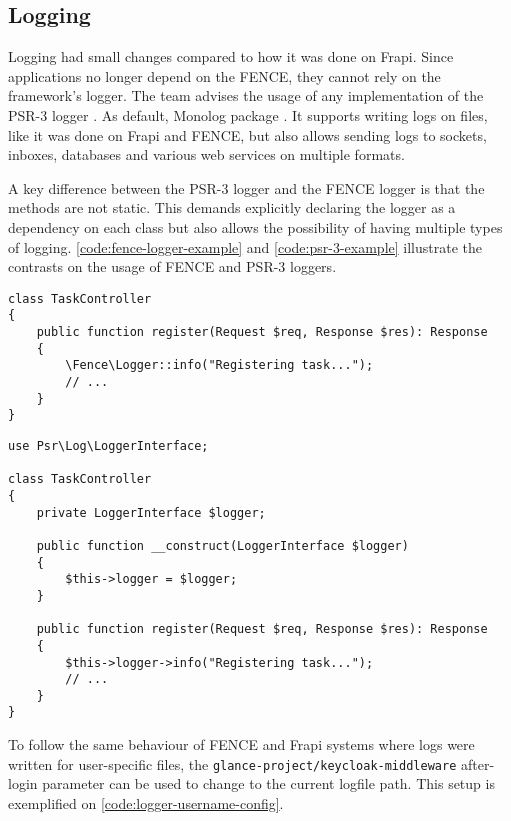 \subsection{Logging}

Logging had small changes compared to how it was done on Frapi. Since applications no longer depend on the FENCE, they cannot rely on the framework's logger. The team advises the usage of any implementation of the PSR-3 logger \cite{psr-3}. As default, Monolog package \cite{monolog}. It supports writing logs on files, like it was done on Frapi and FENCE, but also allows sending logs to sockets, inboxes, databases and various web services on multiple formats.

A key difference between the PSR-3 logger and the FENCE logger is that the methods are not static. This demands explicitly declaring the logger as a dependency on each class but also allows the possibility of having multiple types of logging. \autoref{code:fence-logger-example} and \autoref{code:psr-3-example} illustrate the contrasts on the usage of FENCE and PSR-3 loggers.

\begin{listing}[htbp]
\begin{verbatim}
class TaskController
{
	public function register(Request $req, Response $res): Response
	{
		\Fence\Logger::info("Registering task...");
		// ...
	}
}
\end{verbatim}
\caption{Usage example of the FENCE logger.}
\label{code:fence-logger-example}
\end{listing}

\begin{listing}[htbp]
\begin{verbatim}
use Psr\Log\LoggerInterface;

class TaskController
{
	private LoggerInterface $logger;

	public function __construct(LoggerInterface $logger)
	{
		$this->logger = $logger;
	}

	public function register(Request $req, Response $res): Response
	{
		$this->logger->info("Registering task...");
		// ...
	}
}
\end{verbatim}
\caption{Usage example of the PSR-3 logger.}
\label{code:psr-3-example}
\end{listing}

To follow the same behaviour of FENCE and Frapi systems where logs were written for user-specific files, the \texttt{glance-project/keycloak-middleware} after-login parameter can be used to change to the current logfile path. This setup is exemplified on \autoref{code:logger-username-config}.

